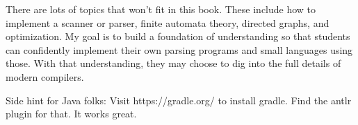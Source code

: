 There are lots of topics that won't fit in this book. These include
how to implement a scanner or parser, finite automata theory, directed
graphs, and optimization. My goal is to build a foundation of understanding
so that students can confidently implement their own parsing programs
and small languages using those. With that understanding, they may choose
to dig into the full details of modern compilers.

Side hint for Java folks: Visit https://gradle.org/ to install gradle.
Find the antlr plugin for that. It works great.
